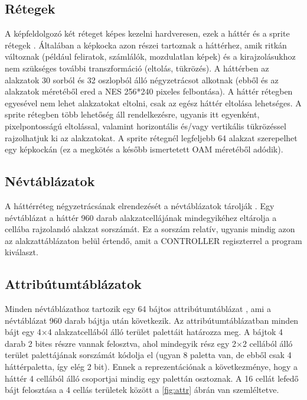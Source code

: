 \subsection{Rétegek}
A képfeldolgozó két réteget képes kezelni hardveresen, ezek a háttér és a sprite rétegek \cite{ppuref}.
Általában a képkocka azon részei tartoznak a háttérhez, amik ritkán változnak (például feliratok, számlálók, mozdulatlan képek) és a kirajzolásukhoz nem szükséges további transzformáció (eltolás, tükrözés). A háttérben az alakzatok 30 sorból és 32 oszlopból álló négyzetrácsot alkotnak (ebből és az alakzatok méretéből ered a NES 256*240 pixeles felbontása).
A háttér rétegben egyesével nem lehet alakzatokat eltolni, csak az egész háttér eltolása lehetséges. A sprite rétegben több lehetőség áll rendelkezésre, ugyanis itt egyenként, pixelpontosságú eltolással, valamint horizontális és/vagy vertikális tükrözéssel rajzolhatjuk ki az alakzatokat. A sprite rétegnél legfeljebb 64 alakzat szerepelhet egy képkockán (ez a megkötés a később ismertetett OAM méretéből adódik).  

\subsection{Névtáblázatok}

A háttérréteg négyzetrácsának elrendezését a névtáblázatok tárolják \cite{ppuref}. Egy névtáblázat a háttér 960 darab alakzatcellájának mindegyikéhez eltárolja a cellába rajzolandó alakzat sorszámát. Ez a sorszám relatív, ugyanis mindig azon az alakzattáblázaton belül értendő, amit a CONTROLLER regiszterrel a program kiválaszt.

\subsection{Attribútumtáblázatok}

Minden névtáblázathoz tartozik egy 64 bájtos attribútumtáblázat \cite{ppuref}, ami a névtáblázat 960 darab bájtja után következik. Az attribútumtáblázatban minden bájt egy 4$\times$4 alakzatcellából álló terület palettáit határozza meg. A bájtok 4 darab 2 bites részre vannak felosztva, ahol mindegyik rész egy 2$\times$2 cellából álló terület palettájának sorszámát kódolja el (ugyan 8 paletta van, de ebből csak 4 háttérpaletta, így elég 2 bit). Ennek a reprezentációnak a következménye, hogy a háttér 4 cellából álló csoportjai mindig egy palettán osztoznak. A 16 cellát lefedő bájt felosztása a 4 cellás területek között a \ref{fig:attr} ábrán van szemléltetve.


